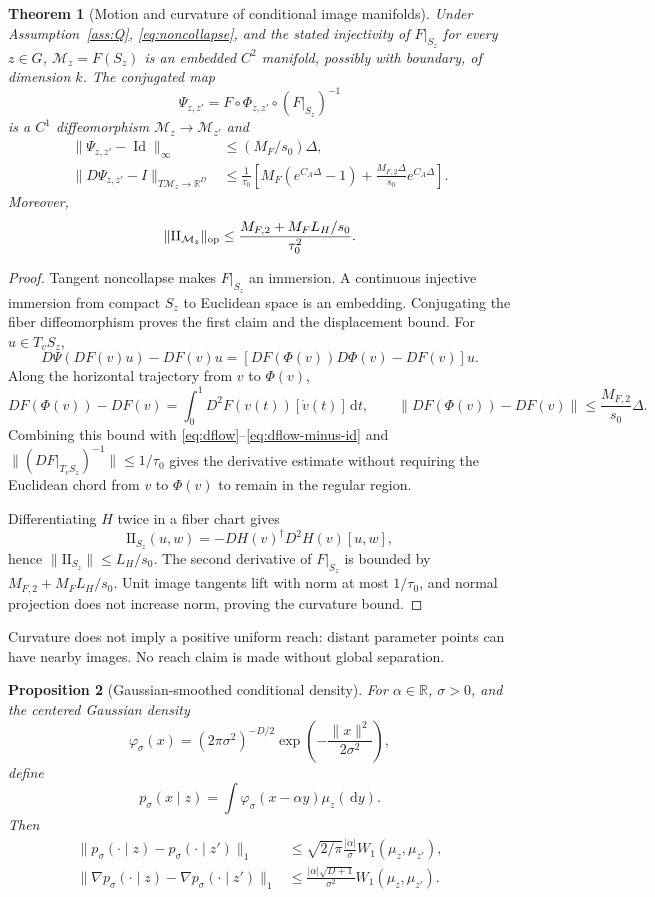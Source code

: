 \documentclass[11pt]{article}
\newtheorem{theorem}{Theorem}[section]
\newtheorem{proposition}[theorem]{Proposition}
\theoremstyle{definition}
\newcommand{\R}{\mathbb R}
\newcommand{\dd}{\,\mathrm d}
\begin{document}
\begin{theorem}[Motion and curvature of conditional image manifolds]
\label{thm:moving-manifold}
Under Assumption~\ref{ass:Q}, \eqref{eq:noncollapse}, and the stated
injectivity of $F|_{S_z}$ for every $z\in G$,
$\mathcal M_z=F(S_z)$ is an embedded $C^2$ manifold, possibly with boundary,
of dimension $k$.  The conjugated map
\[
 \Psi_{z,z'}=F\circ\Phi_{z,z'}\circ(F|_{S_z})^{-1}
\]
is a $C^1$ diffeomorphism $\mathcal M_z\to\mathcal M_{z'}$ and
\begin{align}
 \|\Psi_{z,z'}-\operatorname{Id}\|_\infty
 &\le (M_F/s_0)\Delta,\\
 \|D\Psi_{z,z'}-I\|_{T\mathcal M_z\to\R^D}
 &\le\frac1{\tau_0}\left[
 M_F(e^{C_A\Delta}-1)+\frac{M_{F,2}\Delta}{s_0}e^{C_A\Delta}\right].
\end{align}
Moreover,
\[
 \|\mathrm{II}_{\mathcal M_z}\|_{\rm op}
 \le\frac{M_{F,2}+M_FL_H/s_0}{\tau_0^2}.
\]
\end{theorem}

\begin{proof}
Tangent noncollapse makes $F|_{S_z}$ an immersion.  A continuous injective
immersion from compact $S_z$ to Euclidean space is an embedding.  Conjugating
the fiber diffeomorphism proves the first claim and the displacement bound.
For $u\in T_vS_z$,
\[
 D\Psi(DF(v)u)-DF(v)u
 =[DF(\Phi(v))D\Phi(v)-DF(v)]u.
\]
Along the horizontal trajectory from $v$ to $\Phi(v)$,
\[
 DF(\Phi(v))-DF(v)
 =\int_0^1D^2F(v(t))[\dot v(t)]\dd t,
 \qquad
 \|DF(\Phi(v))-DF(v)\|\le\frac{M_{F,2}}{s_0}\Delta.
\]
Combining this bound with \eqref{eq:dflow}--\eqref{eq:dflow-minus-id} and
$\|(DF|_{T_vS_z})^{-1}\|\le1/\tau_0$ gives the derivative estimate without
requiring the Euclidean chord from $v$ to $\Phi(v)$ to remain in the regular
region.

Differentiating $H$ twice in a fiber chart gives
\[
 \mathrm{II}_{S_z}(u,w)=-DH(v)^\dagger D^2H(v)[u,w],
\]
hence $\|\mathrm{II}_{S_z}\|\le L_H/s_0$.  The second derivative of
$F|_{S_z}$ is bounded by $M_{F,2}+M_FL_H/s_0$.  Unit image tangents lift with
norm at most $1/\tau_0$, and normal projection does not increase norm, proving
the curvature bound.
\end{proof}

Curvature does not imply a positive uniform reach: distant parameter points
can have nearby images.  No reach claim is made without global separation.

\begin{proposition}[Gaussian-smoothed conditional density]
\label{prop:smoothing}
For $\alpha\in\R$, $\sigma>0$, and the centered Gaussian density
\[
 \varphi_\sigma(x)=(2\pi\sigma^2)^{-D/2}
 \exp\!\left(-\frac{\|x\|^2}{2\sigma^2}\right),
\]
define
\[
 p_\sigma(x\mid z)=\int\varphi_\sigma(x-\alpha y)\mu_z(\dd y).
\]
Then
\begin{align}
 \|p_\sigma(\cdot\mid z)-p_\sigma(\cdot\mid z')\|_1
 &\le\sqrt{2/\pi}\frac{|\alpha|}{\sigma}W_1(\mu_z,\mu_{z'}),\\
 \|\nabla p_\sigma(\cdot\mid z)-\nabla p_\sigma(\cdot\mid z')\|_1
 &\le\frac{|\alpha|\sqrt{D+1}}{\sigma^2}W_1(\mu_z,\mu_{z'}).
\end{align}
\end{proposition}
\end{document}
